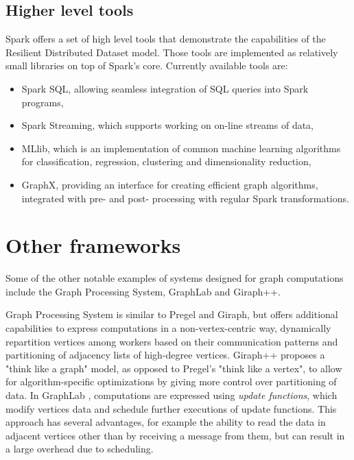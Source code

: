 \subsection{Higher level tools}
Spark offers a set of high level tools that demonstrate the capabilities of the Resilient Distributed Dataset model. Those tools are implemented as relatively small libraries on top of Spark's core. Currently available tools are:
\begin{itemize}
\item Spark SQL, allowing seamless integration of SQL queries into Spark programs,
\item Spark Streaming, which supports working on on-line streams of data,
\item MLlib, which is an implementation of common machine learning algorithms for classification, regression, clustering and dimensionality reduction,
\item GraphX, providing an interface for creating efficient graph algorithms, integrated with pre- and post- processing with regular Spark transformations.
\end{itemize}

\section{Other frameworks}
Some of the other notable examples of systems designed for graph computations include the Graph Processing System, GraphLab and Giraph++.

Graph Processing System \cite{gps} is similar to Pregel and Giraph, but offers additional capabilities to express computations in a non-vertex-centric way, dynamically repartition vertices among workers based on their communication patterns and partitioning of adjacency lists of high-degree vertices. Giraph++ \cite{giraphpp} proposes a "think like a graph" model, as opposed to Pregel's "think like a vertex", to allow for algorithm-specific optimizations by giving more control over partitioning of data. In GraphLab \cite{graphlabwww, graphlab, graphlab2}, computations are expressed using \emph{update functions}, which modify vertices data and schedule further executions of update functions. This approach has several advantages, for example the ability to read the data in adjacent vertices other than by receiving a message from them, but can result in a large overhead due to scheduling.


